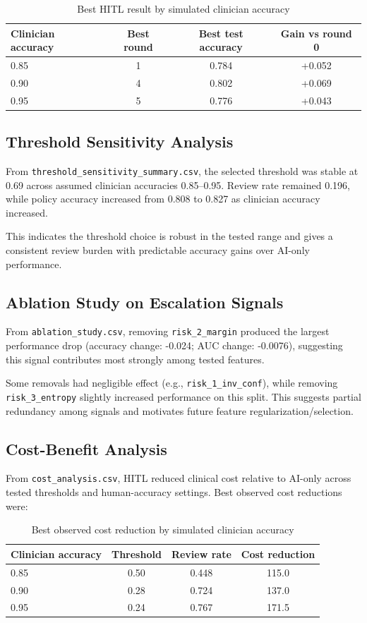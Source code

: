 ﻿\documentclass[12pt]{article}
\begin{document}
\begin{table}[h]
\centering
\caption{Best HITL result by simulated clinician accuracy}
\begin{tabular}{lccc}
\toprule
Clinician accuracy & Best round & Best test accuracy & Gain vs round 0 \\
\midrule
0.85 & 1 & 0.784 & +0.052 \\
0.90 & 4 & 0.802 & +0.069 \\
0.95 & 5 & 0.776 & +0.043 \\
\bottomrule
\end{tabular}
\end{table}

\subsection{Threshold Sensitivity Analysis}
From \texttt{threshold\_sensitivity\_summary.csv}, the selected threshold was stable at 0.69 across assumed clinician accuracies 0.85--0.95. Review rate remained 0.196, while policy accuracy increased from 0.808 to 0.827 as clinician accuracy increased.

This indicates the threshold choice is robust in the tested range and gives a consistent review burden with predictable accuracy gains over AI-only performance.

\subsection{Ablation Study on Escalation Signals}
From \texttt{ablation\_study.csv}, removing \texttt{risk\_2\_margin} produced the largest performance drop (accuracy change: -0.024; AUC change: -0.0076), suggesting this signal contributes most strongly among tested features.

Some removals had negligible effect (e.g., \texttt{risk\_1\_inv\_conf}), while removing \texttt{risk\_3\_entropy} slightly increased performance on this split. This suggests partial redundancy among signals and motivates future feature regularization/selection.

\subsection{Cost-Benefit Analysis}
From \texttt{cost\_analysis.csv}, HITL reduced clinical cost relative to AI-only across tested thresholds and human-accuracy settings. Best observed cost reductions were:

\begin{table}[h]
\centering
\caption{Best observed cost reduction by simulated clinician accuracy}
\begin{tabular}{lccc}
\toprule
Clinician accuracy & Threshold & Review rate & Cost reduction \\
\midrule
0.85 & 0.50 & 0.448 & 115.0 \\
0.90 & 0.28 & 0.724 & 137.0 \\
0.95 & 0.24 & 0.767 & 171.5 \\
\bottomrule
\end{tabular}
\end{table}
\end{document}
